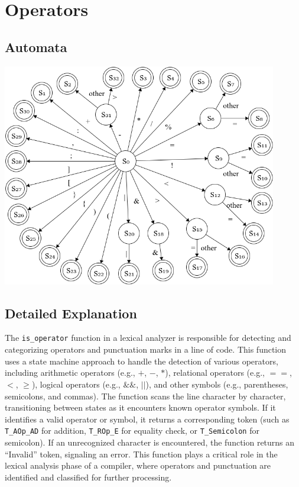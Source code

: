 \documentclass[12pt, a4paper]{report}
\begin{document}
\section{Operators}

\subsection{Automata}

\includegraphics[width=0.9\textwidth]{images/ops.png}

\subsection{Detailed Explanation}

The \texttt{is\_operator} function in a lexical analyzer is responsible for detecting and categorizing operators and punctuation marks in a line of code. This function uses a state machine approach to handle the detection of various operators, including arithmetic operators (e.g., \( + \), \( - \), \( * \)), relational operators (e.g., \( == \), \( < \), \( \geq \)), logical operators (e.g., \( \&\& \), \( || \)), and other symbols (e.g., parentheses, semicolons, and commas). The function scans the line character by character, transitioning between states as it encounters known operator symbols. If it identifies a valid operator or symbol, it returns a corresponding token (such as \texttt{T\_AOp\_AD} for addition, \texttt{T\_ROp\_E} for equality check, or \texttt{T\_Semicolon} for semicolon). If an unrecognized character is encountered, the function returns an ``Invalid'' token, signaling an error. This function plays a critical role in the lexical analysis phase of a compiler, where operators and punctuation are identified and classified for further processing.
\end{document}
